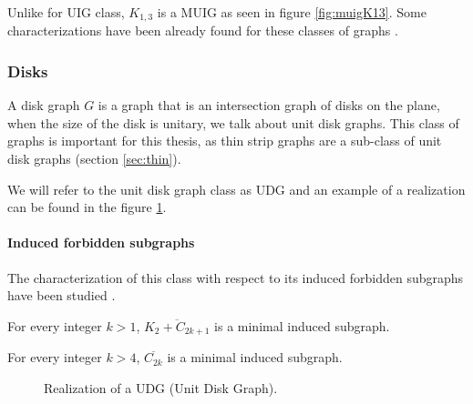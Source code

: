 Unlike for UIG class, $K_{1,3}$ is a MUIG as seen in figure \ref{fig:muigK13}. Some
characterizations have been already found for these classes of graphs \cite{shuchatUnitMixedInterval2014}
\cite{joosCharacterizationMixedUnit2013}.

\subsubsection{Disks}

A disk graph $G$ is a graph that is an intersection graph of disks on the plane, when the size
of the disk is unitary, we talk about unit disk graphs. This class of graphs
is important for this thesis, as thin strip graphs are a sub-class of
unit disk graphs (section \ref{sec:thin}).

We will refer to the unit disk graph class as UDG and an example of a realization
can be found in the figure \ref{fig:udg}.

\paragraph{Induced forbidden subgraphs} The characterization of this class with respect to
its induced forbidden subgraphs have been studied \cite{atminasForbiddenInducedSubgraphs2016}.

\begin{theorem}
  For every integer $k > 1$, $\overline{K_2 + C_{2k+1}}$ is a minimal induced subgraph.
\end{theorem}

\begin{theorem}
  For every integer $k > 4$, $\overline{C_{2k}}$ is a minimal induced subgraph.
\end{theorem}

\begin{figure}
\centering

\begin{scaletikzpicturetowidth}{\textwidth}
\end{scaletikzpicturetowidth}

\caption{Realization of a UDG (Unit Disk Graph).}
\label{fig:udg}
\end{figure}
